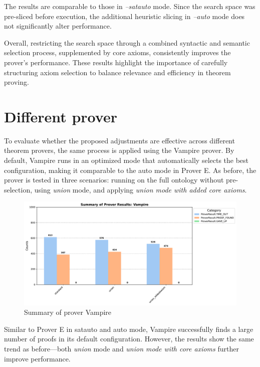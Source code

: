 \documentclass[english,version-2020-11]{uzl-thesis}
\begin{document}
The results are comparable to those in \textit{--satauto} mode. Since the search space was pre-sliced before execution, the additional heuristic slicing in \textit{--auto} mode does not significantly alter performance.

Overall, restricting the search space through a combined syntactic and semantic selection process, supplemented by core axioms, consistently improves the prover’s performance. These results highlight the importance of carefully structuring axiom selection to balance relevance and efficiency in theorem proving.

\section{Different prover}
To evaluate whether the proposed adjustments are effective across different theorem provers, the same process is applied using the Vampire prover. By default, Vampire runs in an optimized mode that automatically selects the best configuration, making it comparable to the auto mode in Prover E. As before, the prover is tested in three scenarios: running on the full ontology without pre-selection, using \textit{union} mode, and applying \textit{union mode with added core axioms}.

\begin{figure}[h!]
    \centering
    \includegraphics[width=\textwidth]{vampire_mode_output.pdf}
    \caption{Summary of prover Vampire}
    \label{fig:prover_results_vampire}
\end{figure}
\FloatBarrier

Similar to Prover E in satauto and auto mode, Vampire successfully finds a large number of proofs in its default configuration. However, the results show the same trend as before—both \textit{union} mode and \textit{union mode with core axioms} further improve performance.
 

\end{document}
